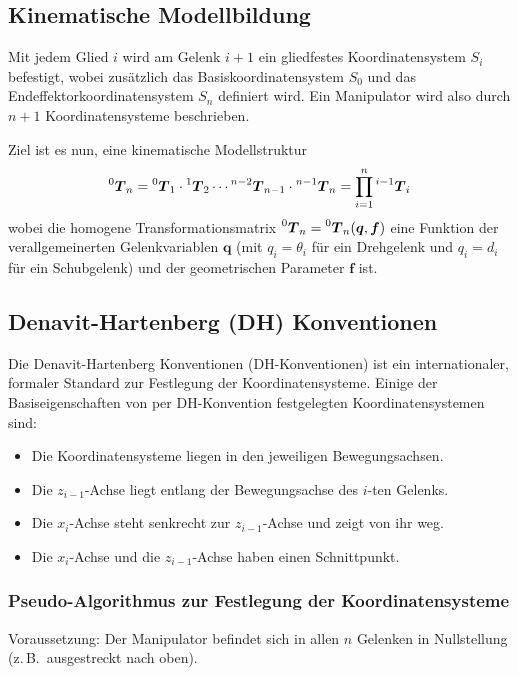 \documentclass[a4paper, 11pt, accentcolor = tud3b]{tudreport}
\newcommand{\inreferenceto}[2]{\prescript{#1}{}{#2}}
\newcommand{\mat}[1]{\boldsymbol{#1}}
\renewcommand{\vec}[1]{\boldsymbol{#1}}
\newcommand{\zB}{z.\,B.~}
\begin{document}
			\subsection{Kinematische Modellbildung}
				Mit jedem Glied \(i\) wird am Gelenk \(i + 1\) ein gliedfestes Koordinatensystem \(S_i\) befestigt, wobei zusätzlich das Basiskoordinatensystem \(S_0\) und das Endeffektorkoordinatensystem \(S_n\) definiert wird. Ein Manipulator wird also durch \( n + 1 \) Koordinatensysteme beschrieben.
				
				Ziel ist es nun, eine kinematische Modellstruktur
				\begin{equation*}
					\inreferenceto{0}{\mat{T}}_n = \inreferenceto{0}{\mat{T}}_1 \cdot \inreferenceto{1}{\mat{T}}_2 \cdots \inreferenceto{n - 2}{\mat{T}}_{n - 1} \cdot \inreferenceto{n - 1}{\mat{T}}_{n} = \prod_{i = 1}^{n} \inreferenceto{i - 1}{\mat{T}}_i
				\end{equation*}
				wobei die homogene Transformationsmatrix \( \inreferenceto{0}{\mat{T}}_n = \inreferenceto{0}{\mat{T}}_n(\vec{q}, \vec{f}) \) eine Funktion der verallgemeinerten Gelenkvariablen \( \vec{q} \) (mit \( q_i = \theta_i \) für ein Drehgelenk und \( q_i = d_i \) für ein Schubgelenk) und der geometrischen Parameter \( \vec{f} \) ist.

			\subsection{Denavit-Hartenberg (DH) Konventionen}
				Die Denavit-Hartenberg Konventionen (DH-Konventionen) ist ein internationaler, formaler Standard zur Festlegung der Koordinatensysteme. Einige der Basiseigenschaften von per DH-Konvention festgelegten Koordinatensystemen sind:
				\begin{itemize}
					\item Die Koordinatensysteme liegen in den jeweiligen Bewegungsachsen.
					\item Die \( z_{i - 1} \)-Achse liegt entlang der Bewegungsachse des \(i\)-ten Gelenks.
					\item Die \(x_i\)-Achse steht senkrecht zur \(z_{i - 1}\)-Achse und zeigt von ihr weg.
					\item Die \(x_i\)-Achse und die \(z_{i - 1}\)-Achse haben einen Schnittpunkt.
				\end{itemize}
			
				\subsubsection{Pseudo-Algorithmus zur Festlegung der Koordinatensysteme}
					Voraussetzung: Der Manipulator befindet sich in allen \(n\) Gelenken in Nullstellung (\zB ausgestreckt nach oben).
					
\end{document}
